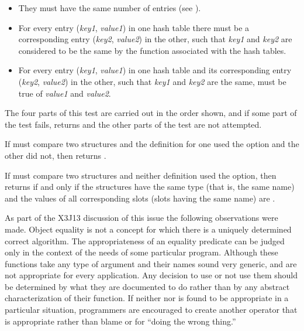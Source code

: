 \begin{defun}[Function]
\begin{new}
\begin{itemize}
\item They must have the same number of entries (see ).

\item For every entry ({\it key1}, {\it value1\/}) in one hash table
there must be a corresponding entry ({\it key2}, {\it value2\/}) in the
other, such that {\it key1} and {\it key2} are considered to be the same
by the  function associated with the hash tables.

\item For every entry ({\it key1}, {\it value1\/}) in one hash table
and its corresponding entry ({\it key2}, {\it value2\/}) in the
other, such that {\it key1} and {\it key2} are the same,
 must be true of {\it value1} and {\it value2}.
\end{itemize}
The four parts of this test are carried out in the order shown, and
if some part of the test fails,  returns  and
the other parts of the test are not attempted.

If  must compare two structures and the 
definition for one used the  option and the other did not,
then  returns .

If  must compare two structures and neither 
definition used the  option,
then  returns  if and only if the structures have the
same type (that is, the same  name) and the values
of all corresponding slots (slots having the same name) are .

As part of the X3J13 discussion of this issue
the following observations were made.
    Object equality is not a concept for which there is a uniquely
    determined correct algorithm. The appropriateness of an equality
    predicate can be judged only in the context of the needs of some
    particular program. Although these functions take any type of
    argument and their names sound very generic,  and  are
    not appropriate for every application. Any decision to use or not
    use them should be determined by what they are documented to do
    rather than by any abstract characterization of their function. If
    neither  nor  is found to be appropriate in a particular
    situation, programmers are encouraged to create another operator
    that is appropriate rather than blame  or  for ``doing
    the wrong thing.''
\end{new}


\end{defun}
